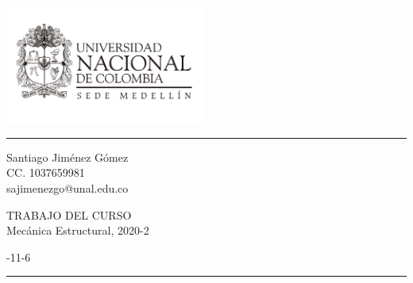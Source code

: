 \documentclass[a4paper]{article}
\begin{document}

\fancyhead[C]{}
	\begin{minipage}{5cm}
		\includegraphics[width=6.5cm]{Logo_un.pdf} 
	\end{minipage}
\hrule \medskip %
\begin{minipage}{0.295\textwidth} 
\raggedright
\footnotesize
Santiago Jiménez Gómez  \hfill\\   
CC. 1037659981\hfill\\
sajimenezgo@unal.edu.co
\end{minipage}
\begin{minipage}{0.4\textwidth} 
\centering 
\large 
TRABAJO DEL CURSO  \\ 
\normalsize 
Mecánica Estructural, 2020-2\\ 
\end{minipage}
\begin{minipage}{0.295\textwidth} 
-11-6\\
\end{minipage}
\medskip\hrule 
\bigskip




\end{document}
